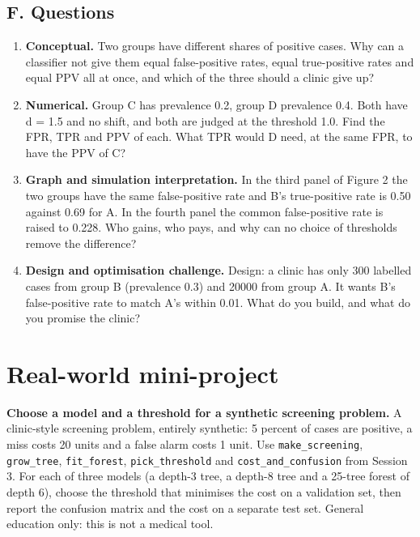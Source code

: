 \documentclass[11pt,a4paper]{article}
\begin{document}
\subsection*{F. Questions}
\begin{enumerate}[nosep]
\item \textbf{Conceptual.} Two groups have different shares of positive cases. Why can a classifier not give them equal false-positive rates, equal true-positive rates and equal PPV all at once, and which of the three should a clinic give up?
\item \textbf{Numerical.} Group C has prevalence 0.2, group D prevalence 0.4. Both have d = 1.5 and no shift, and both are judged at the threshold 1.0. Find the FPR, TPR and PPV of each. What TPR would D need, at the same FPR, to have the PPV of C?
\item \textbf{Graph and simulation interpretation.} In the third panel of Figure 2 the two groups have the same false-positive rate and B's true-positive rate is 0.50 against 0.69 for A. In the fourth panel the common false-positive rate is raised to 0.228. Who gains, who pays, and why can no choice of thresholds remove the difference?
\item \textbf{Design and optimisation challenge.} Design: a clinic has only 300 labelled cases from group B (prevalence 0.3) and 20000 from group A. It wants B's false-positive rate to match A's within 0.01. What do you build, and what do you promise the clinic?
\end{enumerate}

\section{Real-world mini-project}
\textbf{Choose a model and a threshold for a synthetic screening problem.} A clinic-style screening problem, entirely synthetic: 5 percent of cases are positive, a miss costs 20 units and a false alarm costs 1 unit. Use \texttt{make\_screening}, \texttt{grow\_tree}, \texttt{fit\_forest}, \texttt{pick\_threshold} and \texttt{cost\_and\_confusion} from Session 3. For each of three models (a depth-3 tree, a depth-8 tree and a 25-tree forest of depth 6), choose the threshold that minimises the cost on a validation set, then report the confusion matrix and the cost on a separate test set. General education only: this is not a medical tool.
\end{document}
